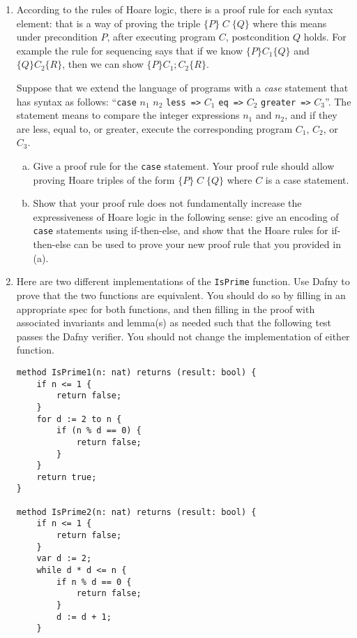 \documentclass{article}
\begin{document}
\begin{enumerate}
\item
According to the rules of Hoare logic,
there is a proof rule for each syntax element: that is a way of proving
the triple $\{P\} \; C \; \{Q\}$ where this means under precondition $P$, after executing program $C$, postcondition $Q$ holds.
For example the rule for sequencing says that if we know $\{P\} C_1 \{Q\}$ and $\{Q\} C_2 \{R\}$,
then we can show $\{P\} C_1; C_2 \{R\}$.

Suppose that we extend the language of programs with a \emph{case} statement that has syntax as follows:
``\texttt{case} $n_1$ $n_2$ \texttt{less =>} $C_1$ \texttt{eq =>} $C_2$ \texttt{greater =>} $C_3$''.
The statement means to compare the integer expressions $n_1$ and $n_2$, and if they are less, equal to, or greater, execute the corresponding program $C_1$, $C_2$, or $C_3$.

\begin{enumerate}[(a)]
\item Give a proof rule for the \texttt{case} statement. Your proof rule should allow proving
Hoare triples of the form $\{P\} \; C \; \{Q\}$ where $C$ is a case statement.
\item Show that your proof rule does not fundamentally increase the expressiveness of Hoare logic in the following sense: give an encoding of \texttt{case} statements using if-then-else,
and show that the Hoare rules for if-then-else can be used to prove your new proof rule that you provided in (a).
\end{enumerate}

\item
Here are two different implementations of the \texttt{IsPrime} function.
Use Dafny to prove that the two functions are equivalent.
You should do so by filling in an appropriate spec for both functions,
and then filling in the proof with associated invariants and lemma(s) as needed
such that the following test passes the Dafny verifier.
You should not change the implementation of either function.

\begin{verbatim}
method IsPrime1(n: nat) returns (result: bool) {
    if n <= 1 {
        return false;
    }
    for d := 2 to n {
        if (n % d == 0) {
            return false;
        }
    }
    return true;
}

method IsPrime2(n: nat) returns (result: bool) {
    if n <= 1 {
        return false;
    }
    var d := 2;
    while d * d <= n {
        if n % d == 0 {
            return false;
        }
        d := d + 1;
    }


\end{verbatim}
\end{enumerate}
\end{document}
